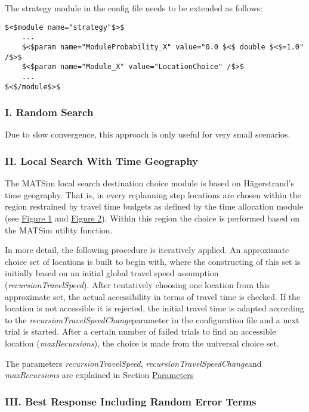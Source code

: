 \documentclass[a4paper,11pt]{report}
\begin{document}
The strategy module in the config file needs to be extended as follows:
\begin{verbatim}
$<$module name="strategy"$>$
    ...
    $<$param name="ModuleProbability_X" value="0.0 $<$ double $<$=1.0" /$>$
    $<$param name="Module_X" value="LocationChoice" /$>$
    ...
$<$/module$>$
\end{verbatim}


\subsubsection{\textbf{I. Random Search}}

Due to slow convergence, this approach is only useful for very small scenarios.


\subsubsection{\textbf{II. Local Search With Time Geography}}

The MATSim local search destination choice module is  based on Hägerstrand's time geography. That is, in every replanning step  locations are chosen within the region restrained by travel time  budgets as defined by the time allocation module (see \hyperlink{Figure1}{Figure 1} and \hyperlink{Figure2}{Figure 2}). Within this region the choice is performed based on the MATSim utility function.

In more detail, the following procedure is  iteratively applied. An approximate choice set of locations is built to  begin with, where the constructing of this set is initially based on an  initial global travel speed assumption (\emph{recursionTravelSpeed}).  After tentatively choosing one location from this approximate set, the  actual accessibility in terms of travel time is checked. If the location  is not accessible it is rejected, the initial travel time is adapted  according to the \emph{recursionTravelSpeedChange}parameter  in the configuration file and a next trial is started. After a certain  number of failed trials to find an accessible location (\emph{maxRecursions}), the choice is made from the universal choice set.

The parameters \emph{recursionTravelSpeed}, \emph{recursionTravelSpeedChange}and \emph{maxRecursions }are explained in Section \hyperlink{parameters}{Parameters}


\subsubsection{\textbf{III. Best Response Including Random Error Terms}}
\end{document}
